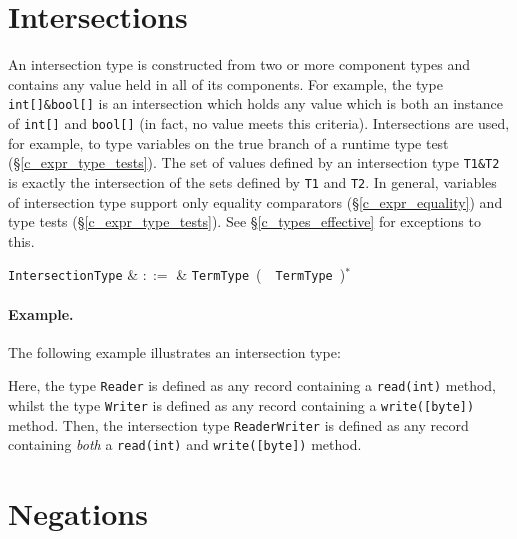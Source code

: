 \section{Intersections}
\label{c_types_intersections}

An intersection type is constructed from two or more component types and contains any value held in all of its components.  For example, the type \lstinline{int[]&bool[]} is an intersection which holds any value which is both an instance of \lstinline{int[]} and \lstinline{bool[]} (in fact, no value meets this criteria).  Intersections are used, for example, to type variables on the true branch of a runtime type test (\S\ref{c_expr_type_tests}).  The set of values defined by an intersection type \lstinline{T1&T2} is exactly the intersection of the sets defined by \lstinline{T1} and \lstinline{T2}.  In general, variables of intersection type support only equality comparators (\S\ref{c_expr_equality}) and type tests (\S\ref{c_expr_type_tests}). See \S\ref{c_types_effective} for exceptions to this.

\begin{syntax}
  \verb+IntersectionType+ & $::=$ & \verb+TermType+\ \big(\ \token{\&}\ \verb+TermType+\
  \big)$^*$\\
\end{syntax}

\paragraph{Example.} The following example illustrates an intersection type:



Here, the type \lstinline{Reader} is defined as any record containing a \lstinline{read(int)} method, whilst the type \lstinline{Writer} is defined as any record containing a \lstinline{write([byte])} method.  Then, the intersection type \lstinline{ReaderWriter} is defined as any record containing {\em both} a \lstinline{read(int)} and \lstinline{write([byte])} method.


\section{Negations}
\label{c_types_negations}

